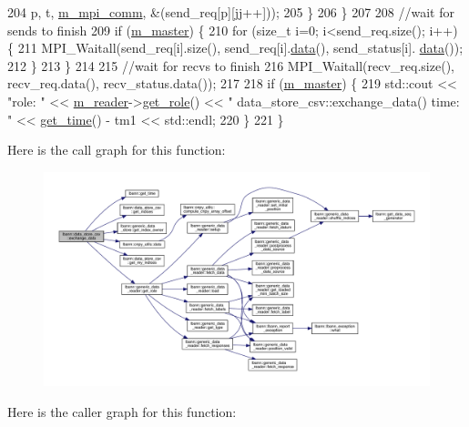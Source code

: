 \begin{DoxyCode}
204         p, t, \hyperlink{classlbann_1_1generic__data__store_ae2d2d61d5d766a7f525eedcb05e0dbf6}{m\_mpi\_comm}, &(send\_req[p][jj++]));
205     \}
206   \}
207 
208   \textcolor{comment}{//wait for sends to finish}
209   \textcolor{keywordflow}{if} (\hyperlink{classlbann_1_1generic__data__store_a143fd33ef3a53180bc62745e369c16f8}{m\_master}) \{
210     \textcolor{keywordflow}{for} (\textcolor{keywordtype}{size\_t} i=0; i<send\_req.size(); i++) \{
211       MPI\_Waitall(send\_req[i].size(), send\_req[i].\hyperlink{namespacelbann_1_1cnpy__utils_a9ac86d96ccb1f8b4b2ea16441738781f}{data}(), send\_status[i].
      \hyperlink{namespacelbann_1_1cnpy__utils_a9ac86d96ccb1f8b4b2ea16441738781f}{data}());
212     \}
213   \}
214 
215   \textcolor{comment}{//wait for recvs to finish}
216   MPI\_Waitall(recv\_req.size(), recv\_req.data(), recv\_status.data());
217 
218   \textcolor{keywordflow}{if} (\hyperlink{classlbann_1_1generic__data__store_a143fd33ef3a53180bc62745e369c16f8}{m\_master}) \{
219     std::cout << \textcolor{stringliteral}{"role: "} << \hyperlink{classlbann_1_1generic__data__store_afa49ced0ab64c632371ea52532a91ec2}{m\_reader}->\hyperlink{classlbann_1_1generic__data__reader_a92982e1b399f37e2ead5aa440883cba5}{get\_role}() << \textcolor{stringliteral}{" data\_store\_csv::exchange\_data()
       time: "} << \hyperlink{namespacelbann_a478d36031ff0659893c4322cd856157f}{get\_time}() - tm1 << std::endl;
220   \}
221 \}
\end{DoxyCode}
Here is the call graph for this function\+:\nopagebreak
\begin{figure}[H]
\begin{center}
\leavevmode
\includegraphics[width=350pt]{classlbann_1_1data__store__csv_acacd039d3ca8caf8958b731a1ce382c6_cgraph}
\end{center}
\end{figure}
Here is the caller graph for this function\+:\nopagebreak
